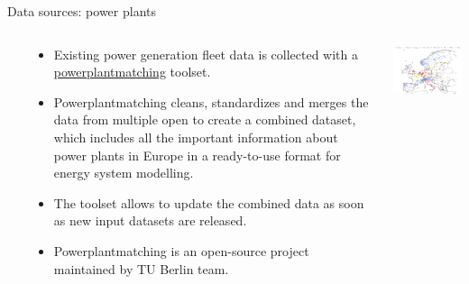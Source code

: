 \begin{frame}{Data sources: power plants}
 
  \begin{columns}[T]\

  \begin{column}{8cm}
    {\footnotesize 
    \begin{itemize}
      \item Existing power generation fleet data is collected with a \href{https://github.com/PyPSA/powerplantmatching}{\alert{powerplantmatching}} toolset.
      
      \item Powerplantmatching cleans, standardizes and merges the data from multiple open  to create a combined dataset, which includes all the important information about power plants in Europe in a ready-to-use format for energy system modelling. 
      
      \item The toolset allows to update the combined data as soon as new input datasets are released.
  
      \item Powerplantmatching is an open-source project maintained by TU Berlin team. \\
      \faGithub~ \\
      \faBook~
    
    \end{itemize}
    }  
  \end{column}

  \begin{column}{8cm}
  \vspace{0.2cm}
  \centering
  \includegraphics[width=8cm]{images/powerplantmatching.png}
  \end{column}

  \end{columns}

\end{frame}



